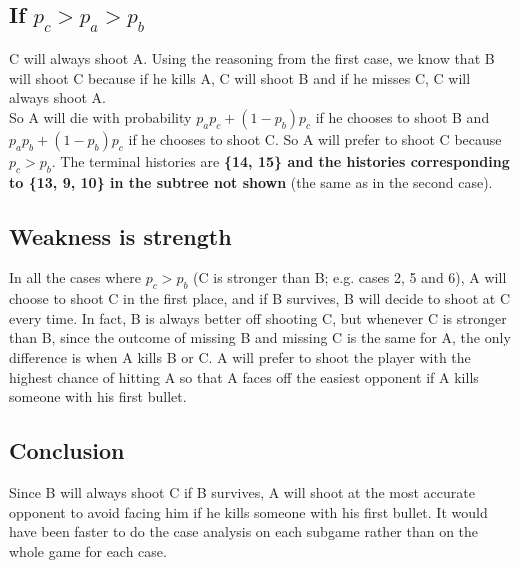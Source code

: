 \documentclass[a4paper]{article}
\begin{document}
\subsection{If $p_c > p_a > p_b$} C will always shoot A. Using the reasoning 
from the first case, we know that B will shoot C because if he kills A, C
will shoot B and if he misses C, C will always shoot A.\\

So A will die with probability $p_ap_c + (1-p_b)p_c$ if he chooses to shoot B
and $p_ap_b + (1-p_b)p_c$ if he chooses to shoot C. So A will prefer to shoot C
because $p_c > p_b$. The terminal histories are \textbf{\{14, 15\} and the 
histories corresponding to \{13, 9, 10\} in the subtree not shown} (the same
as in the second case).

\subsection{Weakness is strength}
In all the cases where $p_c > p_b$ (C is stronger than B; e.g. cases 2, 5 and
6), A will choose to shoot C in the first place, and if B survives, B will 
decide to shoot at C every time. In fact, B is always better off shooting C,
but whenever C is stronger than B, since the outcome of missing B and missing C
is the same for A, the only difference is when A kills B or C. A will prefer
to shoot the player with the highest chance of hitting A so that A faces off 
the easiest opponent if A kills someone with his first bullet.

\subsection{Conclusion}
Since B will always shoot C if B survives, A will shoot at the most accurate
opponent to avoid facing him if he kills someone with his first bullet. It 
would have been faster to do the case analysis on each subgame rather than on
the whole game for each case.
\end{document}
